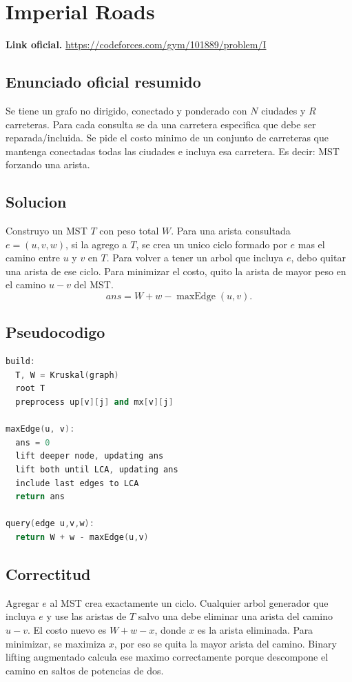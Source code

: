 \documentclass[10pt]{article}
\begin{document}
\newpage

\section{Imperial Roads}
\textbf{Link oficial.} \url{https://codeforces.com/gym/101889/problem/I}

\subsection{Enunciado oficial resumido}
Se tiene un grafo no dirigido, conectado y ponderado con $N$ ciudades y $R$
carreteras. Para cada consulta se da una carretera especifica que debe ser
reparada/incluida. Se pide el costo minimo de un conjunto de carreteras que
mantenga conectadas todas las ciudades e incluya esa carretera. Es decir: MST
forzando una arista.

\subsection{Solucion}
Construyo un MST $T$ con peso total $W$. Para una arista consultada
$e=(u,v,w)$, si la agrego a $T$, se crea un unico ciclo formado por $e$ mas el
camino entre $u$ y $v$ en $T$. Para volver a tener un arbol que incluya $e$,
debo quitar una arista de ese ciclo. Para minimizar el costo, quito la arista de
mayor peso en el camino $u-v$ del MST.
\[
ans=W+w-\operatorname{maxEdge}(u,v).
\]

\subsection{Pseudocodigo}
\begin{lstlisting}[language=C++]
build:
  T, W = Kruskal(graph)
  root T
  preprocess up[v][j] and mx[v][j]

maxEdge(u, v):
  ans = 0
  lift deeper node, updating ans
  lift both until LCA, updating ans
  include last edges to LCA
  return ans

query(edge u,v,w):
  return W + w - maxEdge(u,v)
\end{lstlisting}

\subsection{Correctitud}
Agregar $e$ al MST crea exactamente un ciclo. Cualquier arbol generador que
incluya $e$ y use las aristas de $T$ salvo una debe eliminar una arista del
camino $u-v$. El costo nuevo es $W+w-x$, donde $x$ es la arista eliminada. Para
minimizar, se maximiza $x$, por eso se quita la mayor arista del camino. Binary
lifting augmentado calcula ese maximo correctamente porque descompone el camino
en saltos de potencias de dos.
\end{document}
